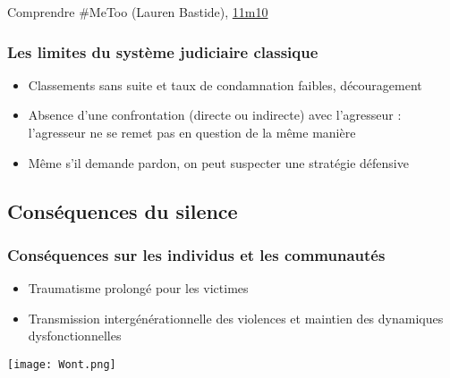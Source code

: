 \documentclass[french]{beamer}
\begin{document}
\begin{frame}
\begin{block}{Comprendre \#MeToo (Lauren Bastide), \href{https://podcasts.musixmatch.com/podcast/01gz0dx010r13t2j6yymscmvrf/episode/01gz0dx010r13t2j6yymscmvrp?time=670.945}{11m10}}
\begin{quote}
    \end{quote}
  \end{block}
\end{frame}

\begin{frame}
  \frametitle{Les limites du système judiciaire classique}
  \begin{itemize}
    \item Classements sans suite et taux de condamnation faibles, découragement
    \item Absence d’une confrontation (directe ou indirecte) avec l’agresseur : l’agresseur ne se remet pas en question de la même manière
    \item Même s’il demande pardon, on peut suspecter une stratégie défensive
  \end{itemize}
\end{frame}

\subsection{Conséquences du silence}
\begin{frame}
  \frametitle{Conséquences sur les individus et les communautés}
  \begin{itemize}
    \item Traumatisme prolongé pour les victimes
    \item Transmission intergénérationnelle des violences et maintien des dynamiques dysfonctionnelles
  \end{itemize}
  \begin{center}
    \texttt{[image: Wont.png]}
  \end{center}
\end{frame}
\end{document}
